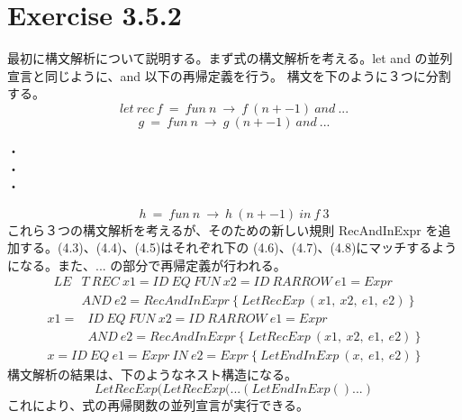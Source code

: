 \documentclass{jreport}
\begin{document}
		\section{Exercise 3.5.2}
			最初に構文解析について説明する。まず式の構文解析を考える。let and の並列宣言と同じように、and 以下の再帰定義を行う。
			構文を下のように３つに分割する。
\begin{equation}let \ rec \ f \ = \ fun \ n \ \rightarrow \ f \ (n + -1) \ and \ ...\end{equation}
\begin{equation}g \ = \ fun \ n \ \rightarrow \ g \ (n + -1) \ and \ ...\end{equation}
	\begin{center}
		・\\
		・\\
		・\\
	\end{center}
\begin{equation}h \ = \ fun \ n \ \rightarrow \ h \ (n + -1) \ in \ f \ 3 \end{equation}
			これら３つの構文解析を考えるが、そのための新しい規則 RecAndInExpr を追加する。(4.3)、(4.4)、(4.5)はそれぞれ下の
			(4.6)、(4.7)、(4.8)にマッチするようになる。また、... の部分で再帰定義が行われる。
\begin{equation}
	\begin{split}
		LE&T \ REC \ x1=ID \ EQ \ FUN \ x2=ID \ RARROW \ e1=Expr \ \\ &AND \ e2=RecAndInExpr \ \{ \ LetRecExp \ (x1, \ x2, \ e1, \ e2) \ \}
	\end{split}
\end{equation}
\begin{equation}
	\begin{split}
		x1=&ID \ EQ \ FUN \ x2=ID \ RARROW \ e1=Expr \\ \ &AND \ e2=RecAndInExpr \ \{ \ LetRecExp \ (x1, \ x2, \ e1, \ e2) \ \}
	\end{split}
\end{equation}
\begin{equation}
	\begin{split}
		x=ID \ EQ \ e1=Expr \ IN \ e2=Expr \ \{ \ LetEndInExp \ (x, \ e1, \ e2) \ \}
	\end{split}
\end{equation}
			構文解析の結果は、下のようなネスト構造になる。
\begin{equation}LetRecExp(LetRecExp(...(LetEndInExp()...)\end{equation}
			これにより、式の再帰関数の並列宣言が実行できる。
\end{document}
